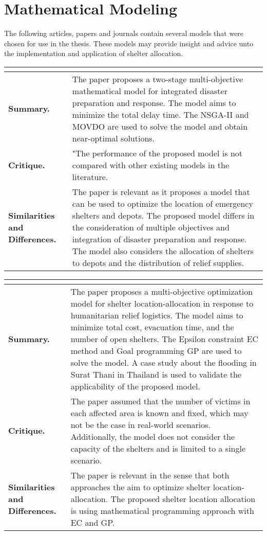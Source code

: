 \section{Mathematical Modeling}

The following articles, papers and journals contain several models that were chosen for use in the thesis. These models may provide insight and advice unto the implementation and application of shelter allocation.


\begin{longtable}{|L{.2\linewidth}|L{.74\linewidth}|}
	\hline
	\\ \hline
	\textbf{Summary.} & The paper proposes a two-stage multi-objective mathematical model for integrated disaster preparation and response. The model aims to minimize the total delay time. The NSGA-II and MOVDO are used to solve the model and obtain near-optimal solutions.\\ \hline
	\textbf{Critique.} & "The performance of the proposed model is not compared with other existing models in the literature.\\ \hline
	\textbf{Similarities and Differences.} & The paper is relevant as it proposes a model that can be used to optimize the location of emergency shelters and depots.	The proposed model differs in the consideration of multiple objectives and integration of disaster preparation and response. The model also considers the allocation of shelters to depots and the distribution of relief supplies.\\ \hline
\end{longtable}

\begin{longtable}{|L{.2\linewidth}|L{.74\linewidth}|}
	\hline
	\\ \hline
	\textbf{Summary.} & The paper proposes a multi-objective optimization model for shelter location-allocation in response to humanitarian relief logistics. The model aims to minimize total cost, evacuation time, and the number of open shelters. The Epsilon constraint EC method and Goal programming GP are used to solve the model. A case study about the flooding in Surat Thani in Thailand is used to validate the applicability of the proposed model.\\ \hline
	\textbf{Critique.} & The paper assumed that the number of victims in each affected area is known and fixed, which may not be the case in real-world scenarios. Additionally, the model does not consider the capacity of  the shelters and is limited to a single scenario.\\ \hline
	\textbf{Similarities and Differences.} & The paper is relevant in the sense that both approaches the aim to optimize shelter location-allocation. 	The proposed shelter location allocation is using mathematical programming approach with EC and GP. \\ \hline
\end{longtable}

